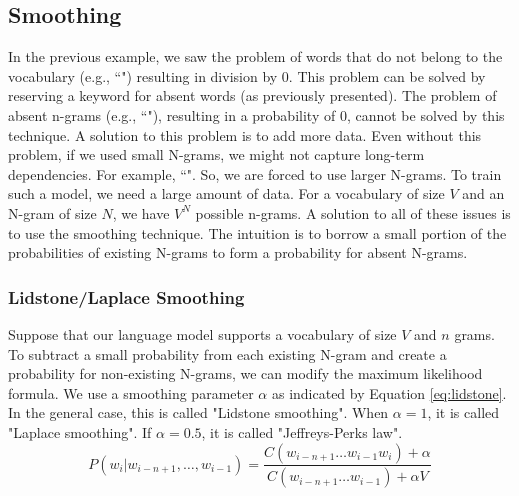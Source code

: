 \documentclass{KBook}
\begin{document}
\subsection{Smoothing}

In the previous example, we saw the problem of words that do not belong to the vocabulary (e.g., ``") resulting in division by $0$.
This problem can be solved by reserving a keyword for absent words (as previously presented).
The problem of absent n-grams (e.g., ``"), resulting in a probability of $0$, cannot be solved by this technique.
A solution to this problem is to add more data.
Even without this problem, if we used small N-grams, we might not capture long-term dependencies.
For example, ``".
So, we are forced to use larger N-grams.
To train such a model, we need a large amount of data.
For a vocabulary of size $V$ and an N-gram of size $N$, we have $V^N$ possible n-grams.
A solution to all of these issues is to use the smoothing technique.
The intuition is to borrow a small portion of the probabilities of existing N-grams to form a probability for absent N-grams.

\subsubsection{Lidstone/Laplace Smoothing}

Suppose that our language model supports a vocabulary of size $V$ and $n$ grams.
To subtract a small probability from each existing N-gram and create a probability for non-existing N-grams, we can modify the maximum likelihood formula.
We use a smoothing parameter $\alpha$ as indicated by Equation \ref{eq:lidstone}.
In the general case, this is called "Lidstone smoothing".
When $\alpha = 1$, it is called "Laplace smoothing".
If $\alpha = 0.5$, it is called "Jeffreys-Perks law".
\begin{equation}
	P(w_i | w_{i-n+1}, \ldots, w_{i-1}) = \frac{C(w_{i-n+1} \ldots w_{i-1} w_i) + \alpha}{C(w_{i-n+1} \ldots w_{i-1}) + \alpha V}
	\label{eq:lidstone}
\end{equation}
\end{document}
